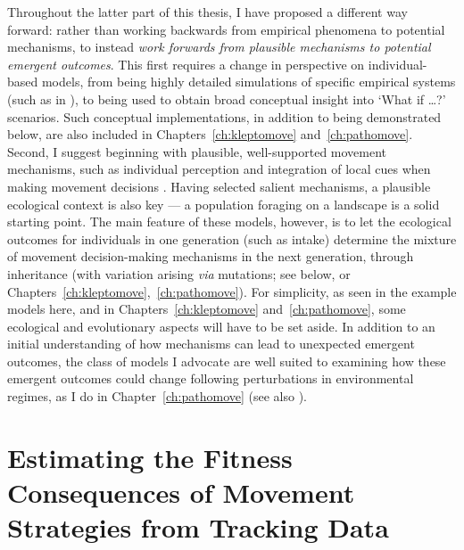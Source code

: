 Throughout the latter part of this thesis, I have proposed a different way forward: rather than working backwards from empirical phenomena to potential mechanisms, to instead \textit{work forwards from plausible mechanisms to potential emergent outcomes}.
This first requires a change in perspective on individual-based models, from being highly detailed simulations of specific empirical systems (such as in \cite{diaz2021,stillman2010,bocedi2014}), to being used to obtain broad conceptual insight into `What if \ldots?' scenarios.
Such conceptual implementations, in addition to being demonstrated below, are also included in Chapters~\ref{ch:kleptomove} and~\ref{ch:pathomove}.
Second, I suggest beginning with plausible, well-supported movement mechanisms, such as individual perception and integration of local cues when making movement decisions \parencite{nathan2008a}.
Having selected salient mechanisms, a plausible ecological context is also key --- a population foraging on a landscape is a solid starting point.
The main feature of these models, however, is to let the ecological outcomes for individuals in one generation (such as intake) determine the mixture of movement decision-making mechanisms in the next generation, through inheritance (with variation arising \textit{via} mutations; see below, or Chapters~\ref{ch:kleptomove},~\ref{ch:pathomove}).
For simplicity, as seen in the example models here, and in Chapters~\ref{ch:kleptomove} and~\ref{ch:pathomove}, some ecological and evolutionary aspects will have to be set aside.
In addition to an initial understanding of how mechanisms can lead to unexpected emergent outcomes, the class of models I advocate are well suited to examining how these emergent outcomes could change following perturbations in environmental regimes, as I do in Chapter~\ref{ch:pathomove} (see also \cite{botero2015}).

\section*{Estimating the Fitness Consequences of Movement Strategies from Tracking Data}

